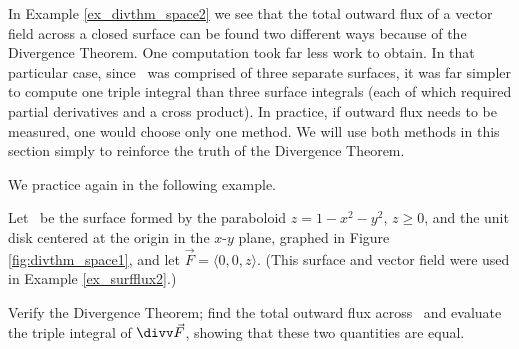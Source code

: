 In Example \ref{ex_divthm_space2} we see that the total outward flux of a vector field across a closed surface can be found two different ways because of the Divergence Theorem. One computation took far less work to obtain. In that particular case, since \surfaceS\ was comprised of three separate surfaces, it was far simpler to compute one triple integral than three surface integrals (each of which required partial derivatives and a cross product). In practice, if outward flux needs to be measured, one would choose only one method. We will use both methods in this section simply to reinforce the truth of the Divergence Theorem.

We practice again in the following example.\\

{Let \surfaceS\ be the surface formed by the paraboloid $z=1-x^2-y^2$, $z\geq 0$, and the unit disk centered at the origin in the $x$-$y$ plane, graphed in Figure \ref{fig:divthm_space1}, and let $\vec F = \langle 0,0,z\rangle$. (This surface and vector field were used in Example \ref{ex_surfflux2}.)


Verify the Divergence Theorem; find the total outward flux across \surfaceS\ and evaluate the triple integral of $\divv \vec F$, showing that these two quantities are equal.
}
